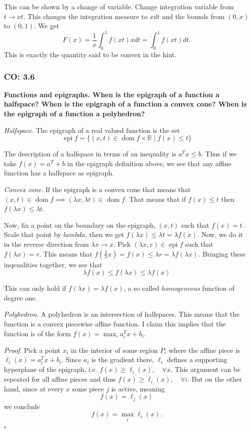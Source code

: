 This can be shown by a change of variable.
Change integration variable from $t \to xt$. 
This changes the integration measure to $xdt$ and the bounds from $(0, x)$ to $(0, 1)$.
We get
\[
    F(x) = \frac{1}{x} \int_0^1f(xt)xdt = \int_0^1 f(xt)dt.
\]
This is exactly the quantity said to be convex in the hint.

\subsubsection{CO: 3.6}
\textbf{Functions and epigraphs. When is the epigraph of a function a halfspace? When is the
epigraph of a function a convex cone? When is the epigraph of a function a polyhedron?}

\textit{Halfspace}. The epigraph of a real valued function is the set 
\[
    \operatorname{epi} f = \{ (x, t) \in \operatorname{dom}f \times \mathbb{R} \mid f(x) \leq t \}
\]

The description of a halfspace in terms of an inequality is $a^T x \leq b$.
Thus if we take $f(x) = a^T + b$ in the epigraph definition above, we see that any affine function has a halfspace as epigraph.

\textit{Convex cone}. If the epigraph is a convex cone that means that $(x, t) \in \operatorname{dom} f \implies (\lambda x, \lambda t) \in \operatorname{dom} f$.
That means that if $f(x) \leq t$ then $f(\lambda x) \leq \lambda t$.

Now, fix a point on the boundary on the epigraph, $(x, t)$ such that $f(x) = t$.
Scale that point by $lambda$, then we get $f(\lambda x) \leq \lambda t = \lambda f(x)$.
Now, we do it in the reverse direction from $\lambda x \to x$.
Pick $(\lambda x, r)\in \operatorname{epi} f$ such that $f(\lambda x) = r$.
This means that $f(\frac{\lambda}{\lambda} x) = f(x) \leq \lambda r = \lambda f(\lambda x)$.
Bringing these inqeualities together, we see that 
\[
\lambda f(x) \leq f(\lambda x) \leq \lambda f(x)
\] 

This can only hold if $f(\lambda x) = \lambda f(x)$, a so called \textit{homogeneous} function of degree one.

\textit{Polyhedron}. A polyhedron is an intersection of halfspaces. 
This means that the function is a convex piecewise affine function. 
I claim this implies that the function is of the form $f(x) = \max_i a_i^T x + b_i$.

\textit{Proof}. Pick a point $x_i$ in the interior of some region $P_i$ where the affine piece is $\ell_i(x) = a_i^T x + b_i$.
Since $a_i$ is the gradient there, $\ell_i$ defines a supporting hyperplane of the epigraph, i.e. $f(x) \geq \ell_i(x), \quad \forall x$.
This argument can be repeated for all affine pieces and thus $f(x) \geq \ell_i(x), \quad \forall i$. 
But on the other hand, since at every $x$ some piece $j$ is active, meaning
\[
    f(x) = \ell_j(x)
\]
we conclude
\[
    f(x) = \max_i \ell_i(x).
\]
\hfill$\square$
